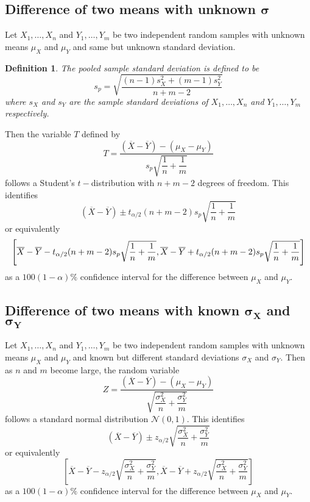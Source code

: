 \documentclass[1pt]{report}
\newtheorem{defn}[thm]{Definition}
\newcommand{\<}{\langle}
\renewcommand{\>}{\rangle}
\renewcommand{\bar}{\overline}
\newcommand{\NN}{\mathcal{N}}
\begin{document}
\subsection{Difference of two means with unknown $\boldsymbol{\sigma}$}
Let $X_1, \dots, X_n$ and $Y_1, \dots, Y_m$ be two independent random samples with unknown means $\mu_X$ and $\mu_Y$ and same but unknown standard deviation.
\begin{defn}\label{def:pooledstandarddeviation}
The \emph{pooled sample standard deviation} is defined to be
$$s_p = \sqrt{\dfrac{(n - 1)s_X^2 + (m-1)s_Y^2}{n + m - 2}}$$
where $s_X$ and $s_Y$ are the sample standard deviations of $X_1, \dots , X_n$ and $Y_1, \dots , Y_m$ respectively.
\end{defn}
Then the variable $T$ defined by 
$$T = \dfrac{(\bar X - \bar Y) - (\mu_X - \mu_Y)}{s_p \sqrt{\dfrac{1}{n} + \dfrac{1}{m}}}$$
follows a Student's $t-$distribution with $n+m-2$ degrees of freedom. This identifies
$$(\bar X - \bar Y) \pm t_{\alpha/2}(n+m-2) s_p\sqrt{\dfrac{1}{n} + \dfrac{1}{m}}$$
or equivalently
$$\resizebox{\textwidth}{!}{$\left[ \bar X - \bar Y - t_{\alpha/2}(n+m-2) s_p \sqrt{\dfrac{1}{n} + \dfrac{1}{m}} , \bar X - \bar Y + t_{\alpha/2}(n+m-2) s_p \sqrt{\dfrac{1}{n} + \dfrac{1}{m}}\right]$}$$
as a $100(1-\alpha)\%$ confidence interval for the difference between $\mu_X$ and $\mu_Y$.
\subsection{Difference of two means with known $\boldsymbol{\sigma_X}$ and $\boldsymbol{\sigma_Y}$}
Let $X_1, \dots , X_n$ and $Y_1, \dots, Y_m$ be two independent random samples with unknown means $\mu_X$ and $\mu_Y$ and known but different standard deviations $\sigma_X$ and $\sigma_Y$. Then as $n$ and $m$ become large, the random variable
$$Z = \dfrac{(\bar X - \bar Y) - (\mu_X - \mu_Y)}{\sqrt{\dfrac{\sigma_X^2}{n} + \dfrac{\sigma_Y^2}{m}}}$$
follows a standard normal distribution $\NN(0,1)$. This identifies
$$ (\bar X - \bar Y) \pm z_{\alpha/2} \sqrt{\frac{\sigma_X^2}{n} + \frac{\sigma_Y^2}{m}}$$
or equivalently
$$\left[ \bar X - \bar Y - z_{\alpha/2} \sqrt{\frac{\sigma_X^2}{n} + \frac{\sigma_Y^2}{m}}, \bar X - \bar Y + z_{\alpha/2} \sqrt{\frac{\sigma_X^2}{n} + \frac{\sigma_Y^2}{m}}\right]$$
as a $100(1-\alpha)\%$ confidence interval for the difference between $\mu_X$ and $\mu_Y$.
\end{document}
